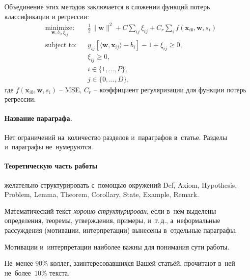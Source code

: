 \documentclass[12pt,twoside]{article}
\begin{document}
Объединение этих методов заключается в сложении функций потерь классификации и регрессии:
\begin{equation}\label{eq12}
\begin{aligned}
& \underset{\mathbf{w}, b_i, \xi_{ij}}{\text{minimize:}}
& & \frac{1}{2} \|\mathbf{w}\|^2 + C\sum\limits_{ij}\xi_{ij} + C_{r}\sum\limits_{i} f(\mathbf{x}_{i0},\mathbf{w}, s_i) \\
& \text{subject to:}
& & y_{ij}[\langle\mathbf{w},\mathbf{x}_{ij}\rangle - b_i]-1+\xi_{ij} \geq 0, \\
&&& \xi_{ij} \geq 0, \\
&&&i\in\{1,\dots,P\}, \\
&&&j\in\{0,\dots,D\},
\end{aligned}
\end{equation}
где $f(\mathbf{x}_{i0},\mathbf{w}, s_i)$ -- MSE, $C_r$ -- коэффициент регуляризации для функции потерь регрессии. 

\paragraph{Название параграфа.}
Нет ограничений на~количество разделов и~параграфов в~статье.
Разделы и~параграфы не~нумеруются.

\paragraph{Теоретическую часть работы} желательно структурировать
с~помощью окружений
Def, Axiom, Hypothesis, Problem, Lemma, Theorem, Corollary, State, Example, Remark.

\begin{Def}
    Математический текст \emph{хорошо структурирован},
    если в~нём выделены определения, теоремы, утверждения, примеры, и~т.\,д.,
    а~неформальные рассуждения (мотивации, интерпретации)
    вынесены в~отдельные параграфы.
\end{Def}

\begin{State}
    Мотивации и~интерпретации наиболее важны для понимания сути работы.
\end{State}

\begin{Theorem}
    Не~менее $90\%$ коллег, заинтересовавшихся Вашей статьёй,
    прочитают в~ней не~более~$10\%$ текста.
\end{Theorem}
\end{document}
